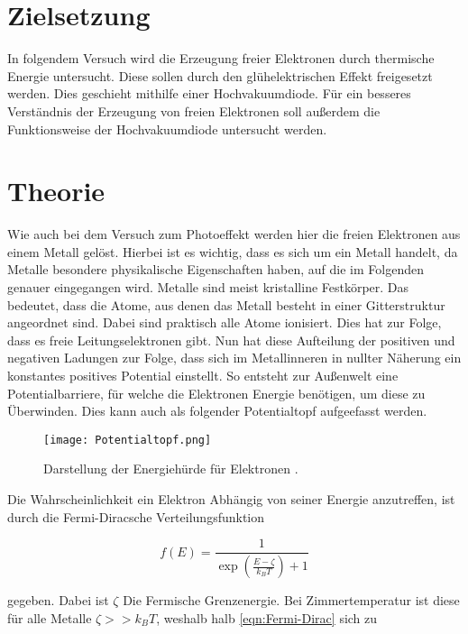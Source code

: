 


\section{Zielsetzung}
\label{sec:Theorie}

In folgendem Versuch wird die Erzeugung freier Elektronen durch thermische Energie untersucht. Diese sollen durch den 
glühelektrischen Effekt freigesetzt werden. Dies geschieht mithilfe einer Hochvakuumdiode. Für ein besseres Verständnis 
der Erzeugung von freien Elektronen soll außerdem die Funktionsweise der Hochvakuumdiode untersucht werden. 

\section{Theorie \cite{Versuchsanleitung_v504}}

Wie auch bei dem Versuch zum Photoeffekt werden hier die freien Elektronen aus einem Metall gelöst. Hierbei ist es 
wichtig, dass es sich um ein Metall handelt, da Metalle besondere physikalische Eigenschaften haben, auf die im 
Folgenden genauer eingegangen wird. Metalle sind meist kristalline Festkörper. Das bedeutet, dass die Atome, aus denen 
das Metall besteht in einer Gitterstruktur angeordnet sind. Dabei sind praktisch alle Atome ionisiert. Dies hat zur Folge, 
dass es freie Leitungselektronen gibt. Nun hat diese Aufteilung der positiven und negativen Ladungen zur Folge, dass sich 
im Metallinneren in nullter Näherung ein konstantes positives Potential einstellt. So entsteht zur Außenwelt eine 
Potentialbarriere, für welche die Elektronen Energie benötigen, um diese zu Überwinden. Dies kann auch als folgender 
Potentialtopf aufgeefasst werden.

\begin{figure}
    \centering
    \texttt{[image: Potentialtopf.png]}
    \caption{Darstellung der Energiehürde für Elektronen \cite{Versuchsanleitung_v504}.}
\end{figure}

\noindent Die Wahrscheinlichkeit ein Elektron Abhängig von seiner Energie anzutreffen, ist durch die Fermi-Diracsche 
Verteilungsfunktion 

\begin{equation}
    f(E)=\frac{1}{\exp{\left(\frac{E-\zeta}{k_B T}\right)} + 1}
    \label{eqn:Fermi-Dirac}
\end{equation}

\noindent gegeben. Dabei ist $\zeta$ Die Fermische Grenzenergie. Bei Zimmertemperatur ist diese für alle Metalle 
$\zeta >>k_B T$, weshalb halb \autoref{eqn:Fermi-Dirac} sich zu 

